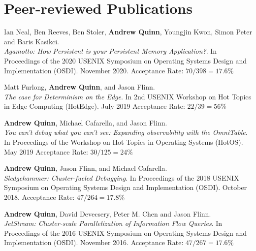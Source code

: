\documentclass[letterpaper,10pt]{article}
\newcommand{\paper}[3]{#1.\\#2 #3}
\begin{document}
\section{Peer-reviewed Publications}
\begin{smenumerate}
\item \paper{Ian Neal, Ben Reeves, Ben Stoler, \textbf{Andrew Quinn}, Youngjin Kwon,
  Simon Peter and Baris Kasikci}{\emph{Agamotto: How Persistent is your
    Persistent Memory Application?}.  In Proceedings of the 2020 USENIX
  Symposium on Operating Systems Design and Implementation (OSDI).  November
  2020.}{Acceptance Rate: $70/398=17.6\%$}

\item \paper{Matt Furlong, \textbf{Andrew Quinn}, and Jason Flinn}
      {\emph{The case for Determinism on the Edge}.  In 2nd USENIX
        Workshop on Hot Topics in Edge Computing (HotEdge).  July
        2019}{Acceptance Rate: $22/39=56\%$}

\item \paper{\textbf{Andrew Quinn}, Michael Cafarella, and Jason
  Flinn}{\emph{You can't debug what you can't see: Expanding
    observability with the OmniTable}. In Proceedings of the Workshop
  on Hot Topics in Operating Systems (HotOS).  May 2019}{Acceptance
  Rate: $30/125=24\%$}

\item \paper{\textbf{Andrew Quinn}, Jason Flinn, and Michael Cafarella}{
  \emph{Sledgehammer: Cluster-fueled Debugging}.  In Proceedings of the 2018
  USENIX Symposium on Operating Systems Design and Implementation (OSDI).
  October 2018.}{Acceptance Rate: $47/264 = 17.8\%$}

\item \paper{\textbf{Andrew Quinn}, David Devecsery, Peter M. Chen and Jason
  Flinn}{\emph{JetStream: Cluster-scale Parallelization of Information
  Flow Queries}.  In Proceedings of the 2016 USENIX Symposium on
    Operating Systems Design and Implementation (OSDI). November
  2016.}{Acceptance Rate: $47/267=17.6\%$}
\end{smenumerate}

\end{document}
